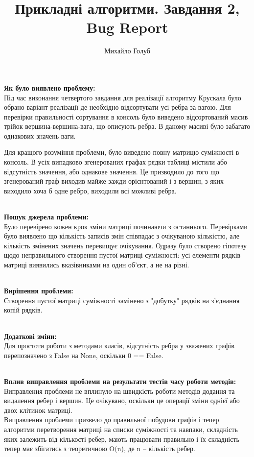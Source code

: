 \documentclass{article}
\title{Прикладні алгоритми. Завдання 2, Bug Report}
\author{Михайло Голуб}
\begin{document}
\maketitle
\newpage

\textbf{Як було виявлено проблему:}\\\indent
Під час виконання четвертого завдання для реалізації алгоритму Крускала було обрано варіант реалізації де необхідно відсортувати усі ребра за вагою. Для перевірки правильності сортування в консоль було виведено відсортований масив трійок вершина-вершина-вага, що описують ребра. В даному масиві було забагато однакових значень ваги.\indent

Для кращого розуміння проблеми, було виведено повну матрицю суміжності в консоль. В усіх випадково згенерованих графах рядки таблиці містили або відсутність значення, або однакове значення. Це призводило до того що згенерований граф виходив майже зажди орієнтований і з вершин, з яких виходило хоча б одне ребро, виходили всі можливі ребра. \\\\\indent

\textbf{Пошук джерела проблеми:}\\\indent
Було перевірено кожен крок зміни матриці починаючи з останнього. Перевірками було виявлено що кількість записів змін співпадає з очікуваною кількістю, але кількість змінених значень перевищує очікування. Одразу було створено гіпотезу щодо неправильного створення пустої матриці суміжності: усі елементи рядків матриці виявились вказівниками на один об'єкт, а не на різні.\\\\\indent

\textbf{Вирішення проблеми:}\\\indent
Створення пустої матриці суміжності замінено з "добутку" рядків на з'єднання копій рядків.\\\\\indent

\textbf{Додаткові зміни:}\\\indent
Для простоти роботи з методами класів, відсутність ребра у зважених графів перепозначено з False на None, оскільки 0 == False.\\\\\indent

\textbf{Вплив виправлення проблеми на результати тестів часу роботи методів:}
Виправлення проблеми не вплинуло на швидкість роботи методів додання та видалення ребер і вершин. Це очікувано, оскільки це операції зміни однієї або двох клітинок матриці.\\\indent
 Виправлення проблеми призвело до правильної побудови графів і тепер алгоритми перетворення матриці на списки суміжності та навпаки, складність яких залежить від кількості ребер, мають працювати правильно і їх складність тепер має збігатись з теоретичною O(n), де n -- кількість ребер.
\end{document}
